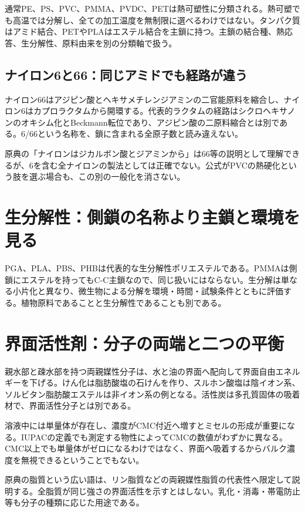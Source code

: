 通常PE、PS、PVC、PMMA、PVDC、PETは熱可塑性に分類される\cite{organic_enpla}。熱可塑でも高温では分解し、全ての加工温度を無制限に選べるわけではない。タンパク質はアミド結合、PETやPLAはエステル結合を主鎖に持つ。主鎖の結合種、熱応答、生分解性、原料由来を別の分類軸で扱う。

\subsection{ナイロン6と66：同じアミドでも経路が違う}
\label{theory:organic:nylon}
ナイロン66はアジピン酸とヘキサメチレンジアミンの二官能原料を縮合し、ナイロン6はカプロラクタムから開環する\cite{organic_step}。代表的ラクタムの経路はシクロヘキサノンのオキシム化とBeckmann転位であり、アジピン酸の二原料縮合とは別である。6/66という名称を、鎖に含まれる全原子数と読み違えない。

原典の「ナイロンはジカルボン酸とジアミンから」は66等の説明として理解できるが、6を含む全ナイロンの製法としては正確でない。公式がPVCの熱硬化という肢を選ぶ場合も、この別の一般化を消さない。

\section{生分解性：側鎖の名称より主鎖と環境を見る}
\label{theory:organic:biodegradation}
PGA、PLA、PBS、PHBは代表的な生分解性ポリエステルである\cite{organic_jbpa,organic_jbpa_en}。PMMAは側鎖にエステルを持ってもC-C主鎖なので、同じ扱いにはならない。生分解は単なる小片化と異なり、微生物による分解を環境・時間・試験条件とともに評価する。植物原料であることと生分解性であることも別である。

\section{界面活性剤：分子の両端と二つの平衡}
\label{theory:organic:surfactant}
親水部と疎水部を持つ両親媒性分子は、水と油の界面へ配向して界面自由エネルギーを下げる。けん化は脂肪酸塩の石けんを作り、スルホン酸塩は陰イオン系、ソルビタン脂肪酸エステルは非イオン系の例となる。活性炭は多孔質固体の吸着材で、界面活性分子とは別である。

溶液中には単量体が存在し、濃度がCMC付近へ増すとミセルの形成が重要になる。IUPACの定義でも測定する物性によってCMCの数値がわずかに異なる\cite{organic_cmc}。CMC以上でも単量体がゼロになるわけではなく、界面へ吸着するからバルク濃度を無視できるということでもない。

原典の脂質という広い語は、リン脂質などの両親媒性脂質の代表性へ限定して説明する。全脂質が同じ強さの界面活性を示すとはしない。乳化・消毒・帯電防止等も分子の種類に応じた用途である。

